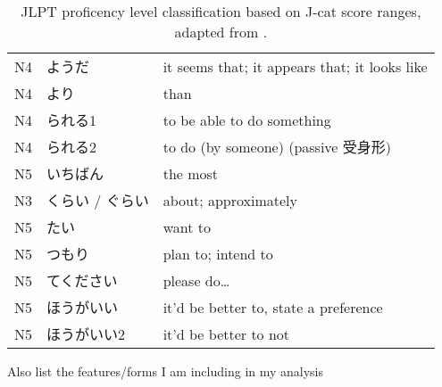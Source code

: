 \begin{table}[h!]
\begin{tabular}{lll}
N4	&   ようだ &       	it seems that; it appears that; it looks like\\
N4  &	より  &       	than\\
N4	&   られる1    &   	to be able to do something\\
N4	&   られる2    &   	to do (by someone) (passive 受身形)\\
N5	&   いちばん    &	the most \\
N3	&   くらい / ぐらい   &	about; approximately\\
N5	&   たい  &	want to\\
N5	&   つもり &	plan to; intend to\\
N5	&   てください   &	please do…\\
N5	&   ほうがいい   &	it'd be better to, state a preference\\
N5	&   ほうがいい2  &   	it'd be better to not\\





\hline
\end{tabular}
\caption[Proficency Levels]{JLPT proficency level classification based on J-cat score ranges, adapted from
\cite{jcat_interpretation_guide}.}
\label{tab:proficency-table}
\end{table}

Also list the features/forms I am including in my analysis
